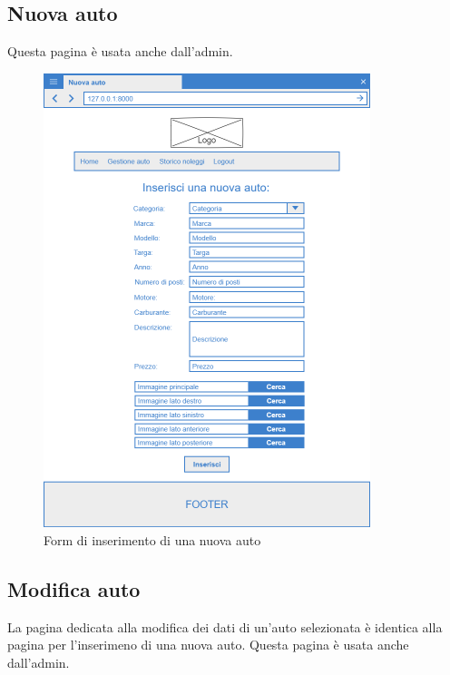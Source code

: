 \documentclass[12pt,a4paperS]{report}
\begin{document}
\begin{normalsize}
			\subsection{Nuova auto}
				Questa pagina è usata anche dall'admin.
				\begin{figure}[H]
					\centering
					\includegraphics[width=0.85\textwidth, height=0.85\textheight, keepaspectratio]{Mockup/Nuova_auto.png}
					\caption{Form di inserimento di una nuova auto}
				\end{figure}
			
			\subsection{Modifica auto}
				La pagina dedicata alla modifica dei dati di un'auto selezionata è identica alla pagina per l'inserimeno di una nuova auto.
				\newline
				Questa pagina è usata anche dall'admin.
			

\end{normalsize}
\end{document}
